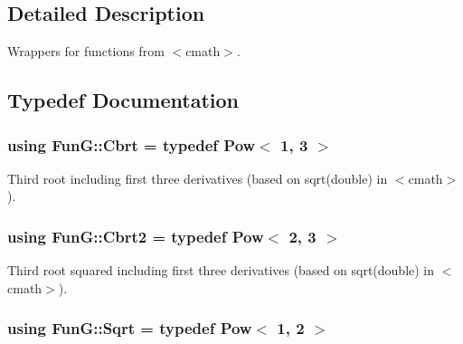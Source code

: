 \subsection{Detailed Description}
Wrappers for functions from $<$cmath$>$. 



\subsection{Typedef Documentation}
\subsubsection[{\texorpdfstring{Cbrt}{Cbrt}}]{\setlength{\rightskip}{0pt plus 5cm}using {\bf Fun\+G\+::\+Cbrt} = typedef Pow$<$ 1, 3 $>$}\hypertarget{group__CMathGroup_gaff369d639f7a316b3f22982e806cb45f}{}\label{group__CMathGroup_gaff369d639f7a316b3f22982e806cb45f}


Third root including first three derivatives (based on sqrt(double) in $<$cmath$>$). 

\subsubsection[{\texorpdfstring{Cbrt2}{Cbrt2}}]{\setlength{\rightskip}{0pt plus 5cm}using {\bf Fun\+G\+::\+Cbrt2} = typedef Pow$<$ 2, 3 $>$}\hypertarget{group__CMathGroup_gab63795eecd1e9a55ea26b24125053f2d}{}\label{group__CMathGroup_gab63795eecd1e9a55ea26b24125053f2d}


Third root squared including first three derivatives (based on sqrt(double) in $<$cmath$>$). 

\subsubsection[{\texorpdfstring{Sqrt}{Sqrt}}]{\setlength{\rightskip}{0pt plus 5cm}using {\bf Fun\+G\+::\+Sqrt} = typedef Pow$<$ 1, 2 $>$}\hypertarget{group__CMathGroup_ga70c69680e967f5ccb79c07e50d44739d}{}\label{group__CMathGroup_ga70c69680e967f5ccb79c07e50d44739d}


